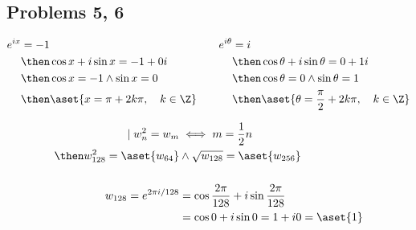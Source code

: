 \begin{itemize}
  \subsection{Problems 5, 6}
  \begin{itemize}
    \begin{align*}
      e^{ix} &= -1 &&& e^{i\theta} &= i \\
             &\then \cos x + i \sin x = -1 + 0i
             &&&
             &\then \cos \theta + i \sin \theta = 0 + 1i \\
             &\then \cos x = -1 \land \sin x = 0
             &&&
             &\then \cos \theta = 0 \land \sin \theta = 1 \\
             &\then \aset{x = \pi + 2k\pi, \quad k \in \Z}
             &&&
             &\then \aset{\theta = \frac{\pi}{2} + 2k\pi, \quad k \in \Z}
    \end{align*}


    \begin{align*}
      \mid w^2_n = w_m &\iff m = \frac{1}{2}n \\
      \then w_{128}^2 = \aset{w_{64}} &\land \sqrt{w_{128}}= \aset{w_{256}} \\\\
      w_{128} = e^{2\pi i / 128} &= \cos \frac{2\pi}{128} + i\sin  \frac{2\pi}{128} \\
                            &= \cos 0 + i\sin 0 = 1 + i 0 = \aset{1}
    \end{align*}
  \end{itemize}

\end{itemize}
